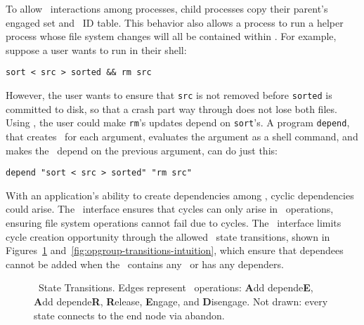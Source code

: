 To allow \opgroup\ interactions among processes, child processes copy
their parent's engaged set and \opgroup\ ID table.
%
This behavior also allows a process to run a helper process whose file
system changes will all be contained within \anopgroup. For example,
suppose a user wants to run in their shell:
%
\vspace{-0.5\baselineskip}
\begin{center}
\begin{small}
\verb+sort < src > sorted && rm src+
\end{small}
\end{center}
\vspace{-0.5\baselineskip}
%
However, the user wants to ensure that \verb+src+ is not removed
before \verb+sorted+ is committed to disk, so that a crash part way
through does not lose both files.
%
Using \opgroups, the user could make \verb+rm+'s updates depend on
\verb+sort+'s.
%
A program \texttt{depend}, that creates \anopgroup\ for each argument,
evaluates the argument as a shell command, and makes the \opgroup\
depend on the previous argument, can do just this:
%
\vspace{-0.5\baselineskip}
\begin{center}
\begin{small}
\verb+depend "sort < src > sorted" "rm src"+
\end{small}
\end{center}
\vspace{-0.5\baselineskip}

With an application's ability to create dependencies among \opgroups,
cyclic dependencies could arise. The \opgroup\ interface ensures that
cycles can only arise in \opgroup\ operations, ensuring file system
operations cannot fail due to cycles. The \opgroup\ interface limits
cycle creation opportunity through the allowed \opgroup\ state
transitions, shown in Figures~\ref{fig:opgroup-transitions-states}
and~\ref{fig:opgroup-transitions-intuition}, which ensure that
dependees cannot be added when the \opgroup\ contains any \chdescs\
or has any dependers.

\begin{figure}[htb]
\vspace{-0.5\baselineskip}
\vspace{-0.5\baselineskip}
\caption{\label{fig:opgroup-transitions-states} \Opgroup\ State
  Transitions. Edges represent \opgroup\ operations: \textbf{A}dd
  depende\textbf{E}, \textbf{A}dd depende\textbf{R}, \textbf{R}elease,
  \textbf{E}ngage, and \textbf{D}isengage. Not drawn: every state
  connects to the end node via abandon.}
\end{figure}


